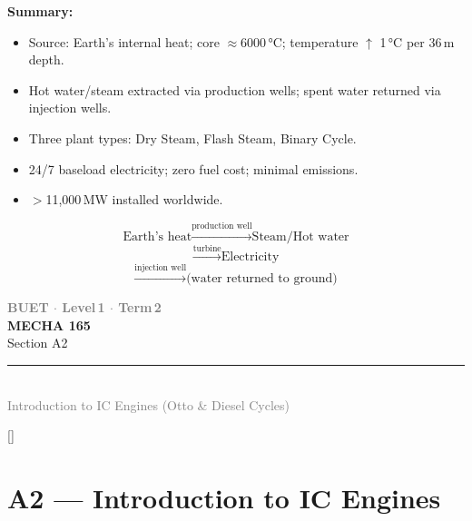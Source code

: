 \documentclass[12pt,a3paper]{article}
\newcommand{\secdivider}[4]{%
  \newpage\thispagestyle{empty}%
  \vspace*{\fill}%
  \begin{tcolorbox}[enhanced,colback=#4!7,colframe=#3,boxrule=1.5pt,arc=8pt,
    left=20pt,right=20pt,top=22pt,bottom=22pt,
    shadow={3pt}{-3pt}{0pt}{black!15}]
    \centering
    {\large\textcolor{gray}{\textbf{BUET $\cdot$ Level\,1 $\cdot$ Term\,2}}}\\[8pt]
    {\fontsize{26}{32}\selectfont\bfseries\textcolor{#3}{MECHA 165}}\\[6pt]
    {\fontsize{15}{19}\selectfont\textcolor{dgray}{#1}}\\[12pt]
    \textcolor{#3!60}{\rule{0.5\textwidth}{0.5pt}}\\[6pt]
    {\small\textcolor{gray}{#2}}
  \end{tcolorbox}%
  \vspace*{\fill}\newpage%
}
\begin{document}
\begin{enumerate}
\begin{tcolorbox}[enhanced,breakable,ansbox,colback=cA!4,colframe=cA,
  boxrule=0.8pt,arc=5pt,
  title={\textbf{Answer}},fonttitle=\bfseries\color{white},colbacktitle=cA]
\textbf{Summary:}
\begin{itemize}[leftmargin=1.5em,itemsep=2pt]
  \item Source: Earth's internal heat; core $\approx$6000\,°C; temperature $\uparrow$ 1\,°C per 36\,m depth.
  \item Hot water/steam extracted via production wells; spent water returned via injection wells.
  \item Three plant types: Dry Steam, Flash Steam, Binary Cycle.
  \item 24/7 baseload electricity; zero fuel cost; minimal emissions.
  \item $>$11,000\,MW installed worldwide.
\end{itemize}

\[
  \text{Earth's heat} \xrightarrow{\text{production well}} \text{Steam/Hot water}
\]
\[
  \xrightarrow{\text{turbine}} \text{Electricity}
\]
\[  
\xrightarrow{\text{injection well}} \text{(water returned to ground)}
\]

\end{tcolorbox}



\end{enumerate}

\secdivider{Section A2}{Introduction to IC Engines (Otto \& Diesel Cycles)}{cB}{cB}
\label{sec:A2}
\titleformat{\section}{\large\bfseries\color{cB}}{}{0em}{}[\titlerule]
\section{A2 --- Introduction to IC Engines}
\end{document}
